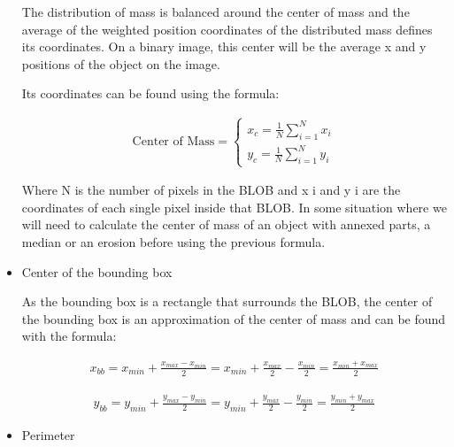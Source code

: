 \begin{itemize}
The distribution of mass is balanced around the center of mass and the average of the weighted position coordinates of the distributed mass defines its coordinates. On a binary image, this center will be the average x and y positions of the object on the image.

Its coordinates can be found using the formula:

\begin{equation}
	\begin{aligned}
  		\ \text{Center of Mass} = \left\{ \begin{array}{ll}
         x_{c}=\displaystyle\frac{1}{N} \displaystyle\sum_{i=1}^N x_{i}\\
         y_{c}=\displaystyle\frac{1}{N} \displaystyle\sum_{i=1}^N y_{i}
        \end{array} \right . \ 
 	\end{aligned}
\end{equation} 


Where N is the number of pixels in the BLOB and x i and y i are the coordinates of each single pixel inside that BLOB. In some situation where we will need to calculate the center of mass of an object with annexed parts, a median or an erosion before using the previous formula.

\item Center of the bounding box

As the bounding box is a rectangle that surrounds the BLOB, the center of the bounding box is an approximation of the center of mass and can be found with the formula:

\begin{equation}
	\begin{aligned}	x_{bb}=x_{min}+\displaystyle\frac{x_{max}-x_{min}}{2}=x_{min}+\displaystyle\frac{x_{max}}{2}-\displaystyle\frac{x_{min}}{2}=\displaystyle\frac{x_{min}+x_{max}}{2}
	\label{BoundingBoxCenterX}
	\end{aligned}
\end{equation}

\begin{equation}	
	\begin{aligned}
	y_{bb}=y_{min}+\displaystyle\frac{y_{max}-y_{min}}{2}=y_{min}+\displaystyle\frac{y_{max}}{2}-\displaystyle\frac{y_{min}}{2}=\displaystyle\frac{y_{min}+y_{max}}{2}
	\label{BoundingBoxCenterY}
	\end{aligned}
\end{equation}


\item Perimeter


\end{itemize}
